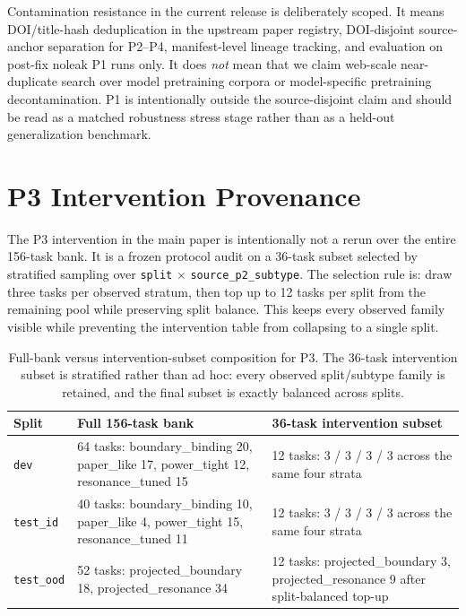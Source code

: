 Contamination resistance in the current release is deliberately scoped. It means DOI/title-hash deduplication in the upstream paper registry, DOI-disjoint source-anchor separation for P2--P4, manifest-level lineage tracking, and evaluation on post-fix noleak P1 runs only. It does \emph{not} mean that we claim web-scale near-duplicate search over model pretraining corpora or model-specific pretraining decontamination. P1 is intentionally outside the source-disjoint claim and should be read as a matched robustness stress stage rather than as a held-out generalization benchmark.

\section{P3 Intervention Provenance}

The P3 intervention in the main paper is intentionally not a rerun over the entire 156-task bank. It is a frozen protocol audit on a 36-task subset selected by stratified sampling over \texttt{split} $\times$ \texttt{source\_p2\_subtype}. The selection rule is: draw three tasks per observed stratum, then top up to 12 tasks per split from the remaining pool while preserving split balance. This keeps every observed family visible while preventing the intervention table from collapsing to a single split.

\begin{table}[t]
\caption{Full-bank versus intervention-subset composition for P3. The 36-task intervention subset is stratified rather than ad hoc: every observed split/subtype family is retained, and the final subset is exactly balanced across splits.}
\label{tab:appendix_p3_subset_provenance}
\centering
\small
\begin{tabular}{lp{50mm}p{50mm}}
\toprule
Split & Full 156-task bank & 36-task intervention subset \\
\midrule
\texttt{dev} & 64 tasks: boundary\_binding 20, paper\_like 17, power\_tight 12, resonance\_tuned 15 & 12 tasks: 3 / 3 / 3 / 3 across the same four strata \\
\texttt{test\_id} & 40 tasks: boundary\_binding 10, paper\_like 4, power\_tight 15, resonance\_tuned 11 & 12 tasks: 3 / 3 / 3 / 3 across the same four strata \\
\texttt{test\_ood} & 52 tasks: projected\_boundary 18, projected\_resonance 34 & 12 tasks: projected\_boundary 3, projected\_resonance 9 after split-balanced top-up \\
\bottomrule
\end{tabular}
\end{table}

